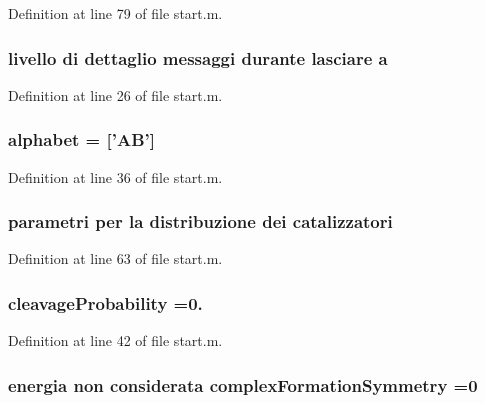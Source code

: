 Definition at line 79 of file start.\+m.

\hypertarget{a00113_a683f8d65c21f968751716fc09c13473b}{
\subsubsection[{a}]{\setlength{\rightskip}{0pt plus 5cm}livello di dettaglio messaggi durante lasciare a}}\label{a00113_a683f8d65c21f968751716fc09c13473b}


Definition at line 26 of file start.\+m.

\hypertarget{a00113_abcbc32fc68e4323620d6171a17310212}{
\subsubsection[{alphabet}]{\setlength{\rightskip}{0pt plus 5cm}alphabet = \mbox{[}'{\bf A\+B}'\mbox{]}}}\label{a00113_abcbc32fc68e4323620d6171a17310212}


Definition at line 36 of file start.\+m.

\hypertarget{a00113_a5a2da1d1b50e51c66813f40da0d9d0d1}{
\subsubsection[{catalizzatori}]{\setlength{\rightskip}{0pt plus 5cm}parametri per la distribuzione dei catalizzatori}}\label{a00113_a5a2da1d1b50e51c66813f40da0d9d0d1}


Definition at line 63 of file start.\+m.

\hypertarget{a00113_a9d512df05ee559766d2b8f08e4704b04}{
\subsubsection[{cleavage\+Probability}]{\setlength{\rightskip}{0pt plus 5cm}cleavage\+Probability =0.}}\label{a00113_a9d512df05ee559766d2b8f08e4704b04}


Definition at line 42 of file start.\+m.

\hypertarget{a00113_ac5d9cfec5453da5efc3e8d574b455833}{
\subsubsection[{complex\+Formation\+Symmetry}]{\setlength{\rightskip}{0pt plus 5cm}energia non {\bf considerata} complex\+Formation\+Symmetry =0}}\label{a00113_ac5d9cfec5453da5efc3e8d574b455833}


